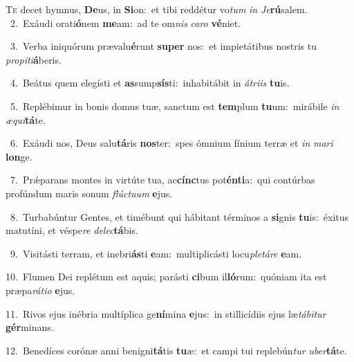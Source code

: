 \lettrine{\initial\textcolor{\initialcolor}{T}}{e} decet hymnus, \textbf{De}\-us, in \textbf{Si}\-on:~\star et tibi reddétur vo\textit{tum} \textit{in} \textit{Je}\-\textbf{rú}salem.\\
{\numbfont\textcolor{\numbcolor}{~2.}}~Exáudi orati\-\textbf{ó}\-nem \textbf{me}\-am:~\star ad te om\textit{nis} \textit{ca}\-\textit{ro} \textbf{vé}\-niet.\par
{\numbfont\textcolor{\numbcolor}{~3.}}~Verba iniquórum prævalu\-\textbf{é}\-runt \textbf{su}\-\textbf{per} nos:~\star et impietátibus nostris tu \textit{pro}\-\textit{pi}\textit{ti}\textbf{á}beris.\par
{\numbfont\textcolor{\numbcolor}{~4.}}~Beátus quem elegísti et \textbf{as}\-sump\-\textbf{sís}\-ti:~\star inhabitábit in \textit{á}\-\textit{tri}\textit{is} \textbf{tu}\-is.\par
{\numbfont\textcolor{\numbcolor}{~5.}}~Replébimur in bonis domus tuæ, sanctum est \textbf{tem}\-plum \textbf{tu}\-um:~\star mirábile \textit{in} \textit{æ}\-\textit{qui}\textbf{tá}te.\par
{\numbfont\textcolor{\numbcolor}{~6.}}~Exáudi nos, Deus salu\-\textbf{tá}\-ris \textbf{nos}\-ter:~\star spes ómnium fínium terræ et \textit{in} \textit{ma}\-\textit{ri} \textbf{lon}\-ge.\par
{\numbfont\textcolor{\numbcolor}{~7.}}~Prǽparans montes in virtúte tua, ac\-\textbf{cínc}\-tus pot\-\textbf{én}\-\textbf{ti}a:~\star qui contúrbas profúndum maris sonum \textit{flúc}\-\textit{tu}\textit{um} \textbf{e}\-jus.\par
{\numbfont\textcolor{\numbcolor}{~8.}}~Turbabúntur Gentes, et timébunt qui hábitant términos a \textbf{si}\-gnis \textbf{tu}\-is:~\star éxitus matutíni, et véspe\textit{re} \textit{de}\-\textit{lec}\textbf{tá}bis.\par
{\numbfont\textcolor{\numbcolor}{~9.}}~Visitásti terram, et inebri\-\textbf{ás}\-ti \textbf{e}\-am:~\star multiplicásti locu\-\textit{ple}\-\textit{tá}\textit{re} \textbf{e}\-am.\par
{\numbfont\textcolor{\numbcolor}{10.}}~Flumen Dei replétum est aquis; parásti \textbf{ci}\-bum il\-\textbf{ló}\-rum:~\star quóniam ita est præpa\-\textit{rá}\-\textit{ti}\textit{o} \textbf{e}\-jus.\par
{\numbfont\textcolor{\numbcolor}{11.}}~Rivos ejus inébria multíplica ge\-\textbf{ní}\-mina \textbf{e}\-jus:~\star in stillicídiis ejus læ\-\textit{tá}\-\textit{bi}\textit{tur} \textbf{gér}\-minans.\par
{\numbfont\textcolor{\numbcolor}{12.}}~Benedíces corónæ anni benigni\-\textbf{tá}\-tis \textbf{tu}\-æ:~\star et campi tui replebún\textit{tur} \textit{u}\-\textit{ber}\textbf{tá}te.\par
